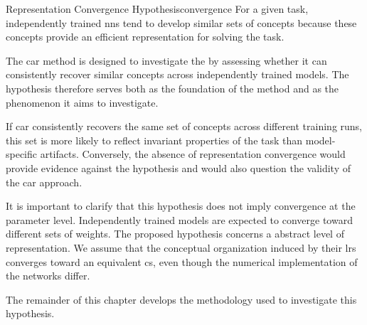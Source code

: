 \begin{hypothesis}{Representation Convergence Hypothesis}{convergence}
For a given task, independently trained \glspl{nn} tend to develop similar sets of concepts because these concepts provide an efficient representation for solving the task.
\end{hypothesis}

The \gls{car} method is designed to investigate the \RepresentationConvergenceHypothesisName by assessing whether it can consistently recover similar concepts across independently trained models.
The hypothesis therefore serves both as the foundation of the method and as the phenomenon it aims to investigate.

If \gls{car} consistently recovers the same set of concepts across different training runs, this set is more likely to reflect invariant properties of the task than model-specific artifacts.
Conversely, the absence of representation convergence would provide evidence against the hypothesis and would also question the validity of the \gls{car} approach.

It is important to clarify that this hypothesis does not imply convergence at the parameter level.
Independently trained models are expected to converge toward different sets of weights.
The proposed hypothesis concerns a abstract level of representation.
We assume that the conceptual organization induced by their \glspl{lr} converges toward an equivalent \gls{cs}, even though the numerical implementation of the networks differ.

The remainder of this chapter develops the methodology used to investigate this hypothesis.